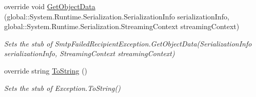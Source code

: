 \begin{DoxyCompactItemize}
override void \hyperlink{class_system_1_1_net_1_1_mail_1_1_fakes_1_1_stub_smtp_failed_recipient_exception_ae203e8e925559402fc7520b466a2f110}{Get\-Object\-Data} (global\-::\-System.\-Runtime.\-Serialization.\-Serialization\-Info serialization\-Info, global\-::\-System.\-Runtime.\-Serialization.\-Streaming\-Context streaming\-Context)
\begin{DoxyCompactList}\small\item\em Sets the stub of Smtp\-Failed\-Recipient\-Exception.\-Get\-Object\-Data(\-Serialization\-Info serialization\-Info, Streaming\-Context streaming\-Context)\end{DoxyCompactList}\item 
override string \hyperlink{class_system_1_1_net_1_1_mail_1_1_fakes_1_1_stub_smtp_failed_recipient_exception_a86b653f2c9a326337d0d3b8d4f4da021}{To\-String} ()
\begin{DoxyCompactList}\small\item\em Sets the stub of Exception.\-To\-String()\end{DoxyCompactList}\end{DoxyCompactItemize}
